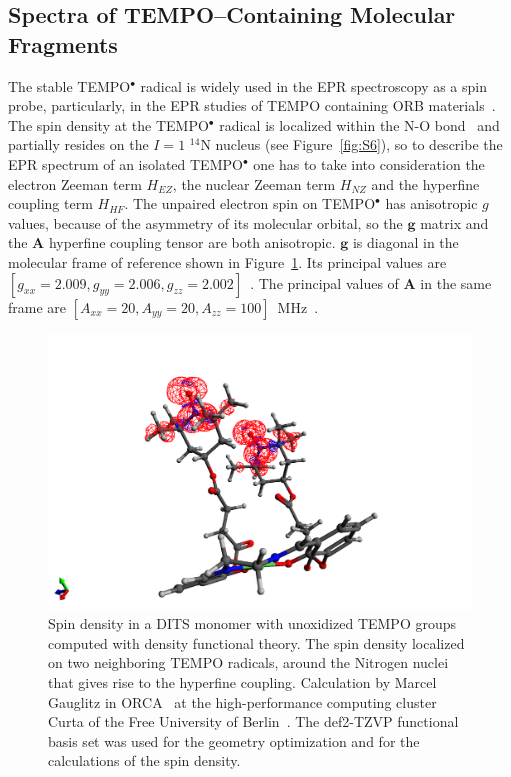 \subsection{Spectra of TEMPO--Containing Molecular Fragments}
The stable TEMPO$^\bullet$ radical is widely used in the EPR spectroscopy as a spin probe, particularly, in the EPR studies of TEMPO containing ORB materials~\cite{nakahara2002_cpl, nishide2004_electact, bahaceci2013_jpowersources, aydin2015_jsoistatelect, khodeir2019_softmatter, Zhang2018}. The spin density at the TEMPO$^\bullet$ radical is localized within the N-O bond~\cite{Owenius2001} and partially resides on the $I=1$ $^{14}$N nucleus (see Figure~\ref{fig:S6}), so to describe the EPR spectrum of an isolated TEMPO$^\bullet$ one has to take into consideration the electron Zeeman term $H_{EZ}$, the nuclear Zeeman term $H_{NZ}$ and the hyperfine coupling term $H_{HF}$. The unpaired electron spin on TEMPO$^\bullet$ has anisotropic $g$ values, because of the asymmetry of its molecular orbital, so the $\textbf{g}$ matrix and the $\textbf{A}$ hyperfine coupling tensor are both anisotropic. $\textbf{g}$ is diagonal in the molecular frame of reference shown in Figure~\ref{fig:TEMPO_dft}. Its principal values are $\left[g_{xx}=2.009,g_{yy}=2.006,g_{zz}=2.002\right]$~\cite{Liu_2008,Bordignon2017}. The principal values of $\textbf{A}$ in the same frame are $\left[A_{xx}=20,A_{yy}=20,A_{zz}=100\right]$~MHz~\cite{Liu_2008,Bordignon2017}.


\begin{figure}[h]
\center
	\includegraphics[width=1\textwidth]{./operando_epr/figures/DITS_DFT.pdf}
	\caption{Spin density in a DITS monomer with unoxidized TEMPO groups computed with density functional theory. The spin density localized on two neighboring TEMPO radicals, around the Nitrogen nuclei that gives rise to the hyperfine coupling. Calculation by Marcel Gauglitz in ORCA~\cite{Orca} at the high-performance computing cluster Curta of the Free University of Berlin~\cite{Curta}. The def2-TZVP functional basis set was used for the geometry optimization and for the calculations of the spin density.}
	\label{fig:TEMPO_dft}
\end{figure}



